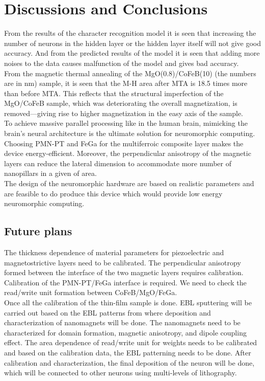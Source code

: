 \documentclass[12pt,a4paper,bold]{thesis}
\theoremstyle{thm}
\theoremstyle{definition}
\begin{document}
 
\chapter{Discussions and Conclusions} \label{ch: conclusions}
\indent\indent\indent From the results of the character recognition model it is seen that increasing the number of neurons in the hidden layer or the hidden layer itself will not give good accuracy. And from the predicted results of the model it is seen that adding more noises to the data causes malfunction of the model and gives bad accuracy.\\   
\indent\indent From the magnetic thermal annealing of the MgO(0.8)/CoFeB(10) (the numbers are in nm) sample, it is seen that the M-H area after MTA is 18.5 times more than before MTA. This reflects that the structural imperfection of the MgO/CoFeB sample, which was deteriorating the overall magnetization, is removed—giving rise to higher magnetization in the easy axis of the sample.\\
\indent\indent To achieve massive parallel processing like in the human brain, mimicking the brain's neural architecture is the ultimate solution for neuromorphic computing. Choosing PMN-PT and FeGa for the multiferroic composite layer makes the device energy-efficient. Moreover, the perpendicular anisotropy of the magnetic layers can reduce the lateral dimension to accommodate more number of nanopillars in a given of area.\\
\indent \indent The design of the neuromorphic hardware are based on realistic parameters and are feasible to do produce this device which would provide low energy neuromorphic computing.
\section{Future plans}
\indent \indent \indent The thickness dependence of material parameters for piezoelectric and magnetostrictive layers need to be calibrated. The perpendicular anisotropy formed between the interface of the two magnetic layers requires calibration. Calibration of the PMN-PT/FeGa interface is required. We need to check the read/write unit formation between CoFeB/MgO/FeGa.\\
\indent \indent Once all the calibration of the thin-film sample is done. EBL sputtering will be carried out based on the EBL patterns from where deposition and characterization of nanomagnets will be done. The nanomagnets need to be characterized for domain formation, magnetic anisotropy, and dipole coupling effect. The area dependence of read/write unit for weights needs to be calibrated and based on the calibration data, the EBL patterning needs to be done. After calibration and characterization, the final deposition of the neuron will be done, which will be connected to other neurons using multi-levels of lithography. 
\end{document}
